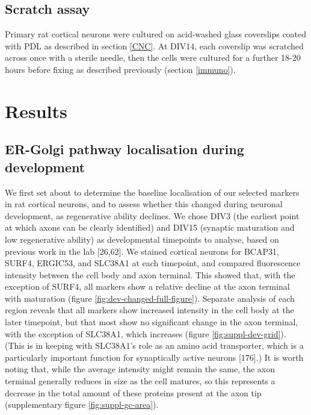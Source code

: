 \documentclass[
  12pt,
  a4paper,
]{book}
\begin{document}
\subsection{Scratch assay}\label{scratch-assay}

Primary rat cortical neurons were cultured on acid-washed glass coverslips coated with PDL as described in section \ref{CNC}. At DIV14, each coverslip was scratched across once with a sterile needle, then the cells were cultured for a further 18-20 hours before fixing as described previously (section \ref{immuno}).

\section{Results}\label{results-2}

\subsection{ER-Golgi pathway localisation during development}\label{ER-dev}

We first set about to determine the baseline localisation of our selected markers in rat cortical neurons, and to assess whether this changed during neuronal development, as regenerative ability declines. We chose DIV3 (the earliest point at which axons can be clearly identified) and DIV15 (synaptic maturation and low regenerative ability) as developmental timepoints to analyse, based on previous work in the lab {[}26,62{]}. We stained cortical neurons for BCAP31, SURF4, ERGIC53, and SLC38A1 at each timepoint, and compared fluorescence intensity between the cell body and axon terminal. This showed that, with the exception of SURF4, all markers show a relative decline at the axon terminal with maturation (figure \ref{fig:dev-changed-full-figure}). Separate analysis of each region reveals that all markers show increased intensity in the cell body at the later timepoint, but that most show no significant change in the axon terminal, with the exception of SLC38A1, which increases (figure \ref{fig:suppl-dev-grid}). (This is in keeping with SLC38A1's role as an amino acid transporter, which is a particularly important function for synaptically active neurons {[}176{]}.) It is worth noting that, while the average intensity might remain the same, the axon terminal generally reduces in size as the cell matures, so this represents a decrease in the total amount of these proteins present at the axon tip (supplementary figure \ref{fig:suppl-gc-area}).
\end{document}
